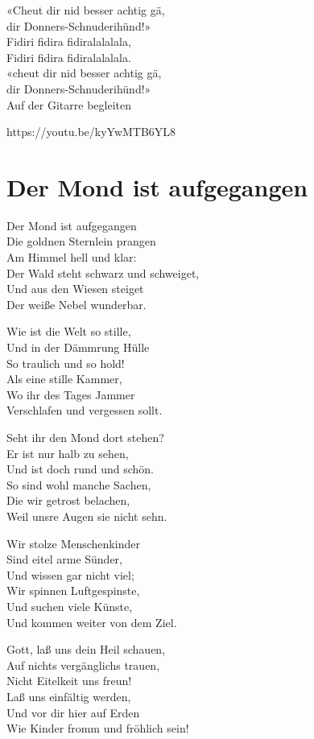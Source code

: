 \documentclass[
  letterpaper,
  twoside=false]{scrbook}
\begin{document}
«Cheut dir nid besser achtig gä,\\
dir Donners-Schnuderihünd!»\\
Fidiri fidira fidiralalalala,\\
Fidiri fidira fidiralalalala.\\
«cheut dir nid besser achtig gä,\\
dir Donners-Schnuderihünd!»\\
Auf der Gitarre begleiten

https://youtu.be/kyYwMTB6YL8

\hypertarget{der-mond-ist-aufgegangen}{%
\chapter{Der Mond ist aufgegangen}\label{der-mond-ist-aufgegangen}}

Der Mond ist aufgegangen\\
Die goldnen Sternlein prangen\\
Am Himmel hell und klar:\\
Der Wald steht schwarz und schweiget,\\
Und aus den Wiesen steiget\\
Der weiße Nebel wunderbar.

Wie ist die Welt so stille,\\
Und in der Dämmrung Hülle\\
So traulich und so hold!\\
Als eine stille Kammer,\\
Wo ihr des Tages Jammer\\
Verschlafen und vergessen sollt.

Seht ihr den Mond dort stehen?\\
Er ist nur halb zu sehen,\\
Und ist doch rund und schön.\\
So sind wohl manche Sachen,\\
Die wir getrost belachen,\\
Weil unsre Augen sie nicht sehn.

Wir stolze Menschenkinder\\
Sind eitel arme Sünder,\\
Und wissen gar nicht viel;\\
Wir spinnen Luftgespinste,\\
Und suchen viele Künste,\\
Und kommen weiter von dem Ziel.

Gott, laß uns dein Heil schauen,\\
Auf nichts vergänglichs trauen,\\
Nicht Eitelkeit uns freun!\\
Laß uns einfältig werden,\\
Und vor dir hier auf Erden\\
Wie Kinder fromm und fröhlich sein!
\end{document}
